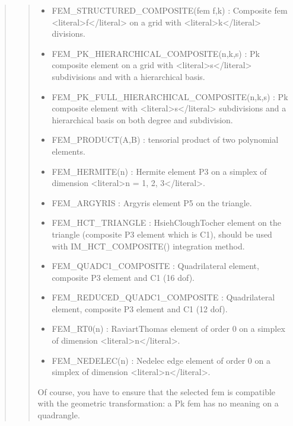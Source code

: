 \documentclass[a4paper,11pt,english]{sphinxmanual}
\begin{document}
\begin{quote}
\begin{quote}
\begin{itemize}
\item {} 
\sphinxAtStartPar
FEM\_STRUCTURED\_COMPOSITE(fem f,k) :
Composite fem \textless{}literal\textgreater{}f\textless{}/literal\textgreater{} on a grid with \textless{}literal\textgreater{}k\textless{}/literal\textgreater{} divisions.

\item {} 
\sphinxAtStartPar
FEM\_PK\_HIERARCHICAL\_COMPOSITE(n,k,s) :
Pk composite element on a grid with \textless{}literal\textgreater{}s\textless{}/literal\textgreater{} subdivisions and with a
hierarchical basis.

\item {} 
\sphinxAtStartPar
FEM\_PK\_FULL\_HIERARCHICAL\_COMPOSITE(n,k,s) :
Pk composite element with \textless{}literal\textgreater{}s\textless{}/literal\textgreater{} subdivisions and a hierarchical basis
on both degree and subdivision.

\item {} 
\sphinxAtStartPar
FEM\_PRODUCT(A,B) :
tensorial product of two polynomial elements.

\item {} 
\sphinxAtStartPar
FEM\_HERMITE(n) :
Hermite element P3 on a simplex of dimension \textless{}literal\textgreater{}n = 1, 2, 3\textless{}/literal\textgreater{}.

\item {} 
\sphinxAtStartPar
FEM\_ARGYRIS :
Argyris element P5 on the triangle.

\item {} 
\sphinxAtStartPar
FEM\_HCT\_TRIANGLE :
Hsieh\sphinxhyphen{}Clough\sphinxhyphen{}Tocher element on the triangle (composite P3 element
which is C1), should be used with IM\_HCT\_COMPOSITE() integration
method.

\item {} 
\sphinxAtStartPar
FEM\_QUADC1\_COMPOSITE :
Quadrilateral element, composite P3 element and C1 (16 dof).

\item {} 
\sphinxAtStartPar
FEM\_REDUCED\_QUADC1\_COMPOSITE :
Quadrilateral element, composite P3 element and C1 (12 dof).

\item {} 
\sphinxAtStartPar
FEM\_RT0(n) :
Raviart\sphinxhyphen{}Thomas element of order 0 on a simplex of dimension \textless{}literal\textgreater{}n\textless{}/literal\textgreater{}.

\item {} 
\sphinxAtStartPar
FEM\_NEDELEC(n) :
Nedelec edge element of order 0 on a simplex of dimension \textless{}literal\textgreater{}n\textless{}/literal\textgreater{}.

\end{itemize}

\sphinxAtStartPar
Of course, you have to ensure that the selected fem is compatible with
the geometric transformation: a Pk fem has no meaning on a quadrangle.
\end{quote}
\end{quote}
\end{document}
